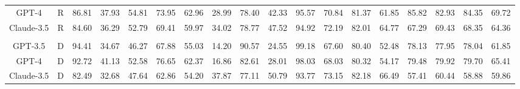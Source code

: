 \documentclass{article} %
\begin{document}
\begin{table}[htb!]
{\begin{tabular}{ccc*{15}c}
GPT-4 & R & 86.81 & 37.93 & 54.81 & 73.95 & 62.96 & 28.99 & 78.40 & 42.33 & 95.57 & 70.84 & 81.37 & 61.85 & 85.82 & 82.93 & 84.35 & 69.72 \\
Claude-3.5 & R & 84.60 & 36.29 & 52.79 & 69.41 & 59.97 & 34.02 & 78.77 & 47.52 & 94.92 & 72.19 & 82.01 & 64.77 & 67.29 & 69.43 & 68.35 & 64.36 \\\\
GPT-3.5 & D & 94.41 & 34.67 & 46.27 & 67.88 & 55.03 & 14.20 & 90.57 & 24.55 & 99.18 & 67.60 & 80.40 & 52.48 & 78.13 & 77.95 & 78.04 & 61.85 \\
GPT-4 & D & 92.72 & 41.13 & 52.58 & 76.65 & 62.37 & 16.86 & 82.61 & 28.01 & 98.03 & 68.03 & 80.32 & 54.17 & 79.48 & 79.92 & 79.70 & 65.41 \\
Claude-3.5 & D & 82.49 & 32.68 & 47.64 & 62.86 & 54.20 & 37.87 & 77.11 & 50.79 & 93.77 & 73.15 & 82.18 & 66.49 & 57.41 & 60.44 & 58.88 & 59.86 \\

\bottomrule
\end{tabular}
}
\end{table}
\end{document}
